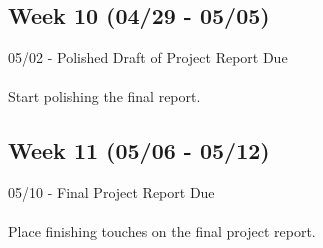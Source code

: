 \documentclass{article}
\begin{document}
\subsection*{Week 10 (04/29 - 05/05)}
05/02 - Polished Draft of Project Report Due\\
\\
Start polishing the final report.

\subsection*{Week 11 (05/06 - 05/12)}
05/10 - Final Project Report Due\\
\\
Place finishing touches on the final project report.



\end{document}
